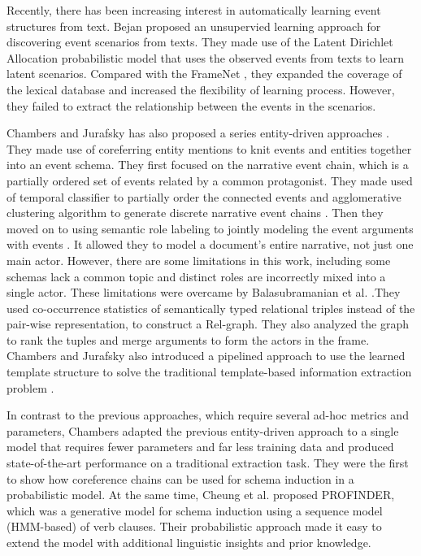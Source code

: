 Recently, there has been increasing interest in automatically 
learning event structures from text. 
Bejan \cite{B08} proposed an unsupervied learning approach for discovering 
event scenarios from texts. 
They made use of the Latent Dirichlet Allocation probabilistic 
model that uses the observed events from texts to learn latent scenarios.
Compared with the FrameNet \cite{B98framenet}, they expanded the coverage of the 
lexical database and increased the flexibility of learning process.
However, they failed to extract the relationship between the events in the scenarios.

Chambers and Jurafsky has also proposed a series entity-driven approaches \cite{CJ08chain, CJ09schema, CJ11template}.
They made use of coreferring entity mentions to knit events and entities together into an event schema. 
They first focused on the narrative event chain, which is a partially ordered set of events related by a common protagonist. They made used of temporal classifier to partially order the connected events and agglomerative clustering algorithm to generate discrete narrative event chains \cite{CJ08chain}. Then they moved on to 
using semantic role labeling to jointly modeling the event arguments with events \cite{CJ09schema}. It allowed they to model a document's entire narrative, not just one main actor. 
However, there are some limitations in this work, including some schemas lack a common topic and distinct roles are incorrectly mixed into a single actor. These limitations were overcame by Balasubramanian et al. \cite{BSME13}.They used co-occurrence statistics of semantically typed relational triples instead of the pair-wise representation, to construct a Rel-graph. They also analyzed the graph to rank the tuples and merge arguments to form the actors in the frame. Chambers and Jurafsky also introduced a pipelined approach to use the learned template structure to solve the traditional template-based information extraction problem \cite{CJ11template}.

In contrast to the previous approaches, which require several ad-hoc metrics and parameters, 
Chambers \cite{C13} adapted the previous entity-driven approach to a single model that requires fewer parameters and far less training data and produced state-of-the-art performance on a traditional extraction task. They were the first to show how coreference chains can be used for schema induction in a probabilistic model.
At the same time, Cheung et al. \cite{CPV13} proposed PROFINDER, which was a generative model for schema induction using a sequence model (HMM-based) of verb clauses. Their probabilistic approach made it easy to extend the model with additional linguistic insights and prior knowledge.


